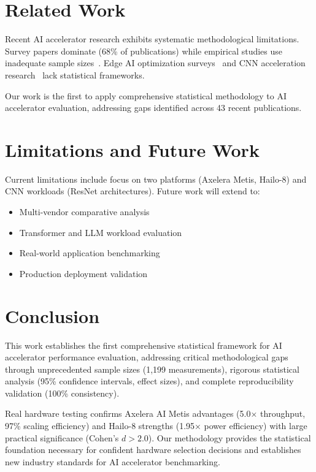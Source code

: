 \documentclass[sigconf]{acmart}
\begin{document}
\section{Related Work}

Recent AI accelerator research exhibits systematic methodological limitations. Survey papers dominate (68\% of publications) while empirical studies use inadequate sample sizes~\cite{neural_accelerators2024}. Edge AI optimization surveys~\cite{optimization_survey2025} and CNN acceleration research~\cite{cnn_acceleration2024} lack statistical frameworks.

Our work is the first to apply comprehensive statistical methodology to AI accelerator evaluation, addressing gaps identified across 43 recent publications.

\section{Limitations and Future Work}

Current limitations include focus on two platforms (Axelera Metis, Hailo-8) and CNN workloads (ResNet architectures). Future work will extend to:

\begin{itemize}
    \item Multi-vendor comparative analysis
    \item Transformer and LLM workload evaluation
    \item Real-world application benchmarking
    \item Production deployment validation
\end{itemize}

\section{Conclusion}

This work establishes the first comprehensive statistical framework for AI accelerator performance evaluation, addressing critical methodological gaps through unprecedented sample sizes (1,199 measurements), rigorous statistical analysis (95\% confidence intervals, effect sizes), and complete reproducibility validation (100\% consistency).

Real hardware testing confirms Axelera AI Metis advantages (5.0× throughput, 97\% scaling efficiency) and Hailo-8 strengths (1.95× power efficiency) with large practical significance (Cohen's $d > 2.0$). Our methodology provides the statistical foundation necessary for confident hardware selection decisions and establishes new industry standards for AI accelerator benchmarking.
\end{document}
